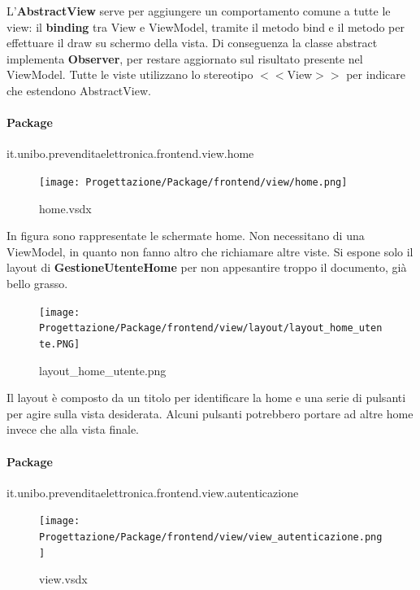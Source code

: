 \documentclass[a4paper]{article}
\begin{document}
L'\textbf{AbstractView} serve per aggiungere un comportamento comune a tutte le view: il \textbf{binding} tra View e ViewModel, tramite il metodo bind e il metodo per effettuare il draw su schermo della vista. Di conseguenza la classe abstract implementa \textbf{Observer}, per restare aggiornato sul risultato presente nel ViewModel. Tutte le viste utilizzano lo stereotipo $<<$View$>>$ per indicare che estendono AbstractView.

\newpage

\paragraph{Package} it.unibo.prevenditaelettronica.frontend.view.home



\begin{figure}[H]
    \texttt{[image: Progettazione/Package/frontend/view/home.png]}
    \centering
    \caption{home.vsdx}
\end{figure}

In figura sono rappresentate le schermate home. Non necessitano di una ViewModel, in quanto non fanno altro che richiamare altre viste. Si espone solo il layout di \textbf{GestioneUtenteHome} per non appesantire troppo il documento, già bello grasso.

\begin{figure}[H]
    \texttt{[image: Progettazione/Package/frontend/view/layout/layout\_home\_utente.PNG]}
    \centering
    \caption{layout\_home\_utente.png}
\end{figure}

Il layout è composto da un titolo per identificare la home e una serie di pulsanti per agire sulla vista desiderata. Alcuni pulsanti potrebbero portare ad altre home invece che alla vista finale.

\newpage

\paragraph{Package} it.unibo.prevenditaelettronica.frontend.view.autenticazione


\begin{figure}[H]
    \texttt{[image: Progettazione/Package/frontend/view/view\_autenticazione.png]}
    \centering
    \caption{view.vsdx}
\end{figure}
\end{document}
